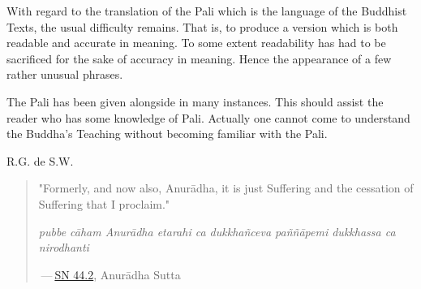 With regard to the translation of the Pali which is the language of the Buddhist Texts, the usual difficulty remains. That is, to produce a version which is both readable and accurate in meaning. To some extent readability has had to be sacrificed for the sake of accuracy in meaning. Hence the appearance of a few rather unusual phrases.

The Pali has been given alongside in many instances. This should assist the reader who has some knowledge of Pali. Actually one cannot come to understand the Buddha's Teaching without becoming familiar with the Pali.

R.G. de S.W.

\begin{quote}
"Formerly, and now also, Anurādha, it is just Suffering and the cessation of Suffering that I proclaim."

\emph{pubbe cāham Anurādha etarahi ca dukkhañceva paññāpemi dukkhassa ca nirodhanti}

 --- \href{https://suttacentral.net/sn44.2/en/sujato}{SN 44.2}, Anurādha Sutta
\end{quote}
